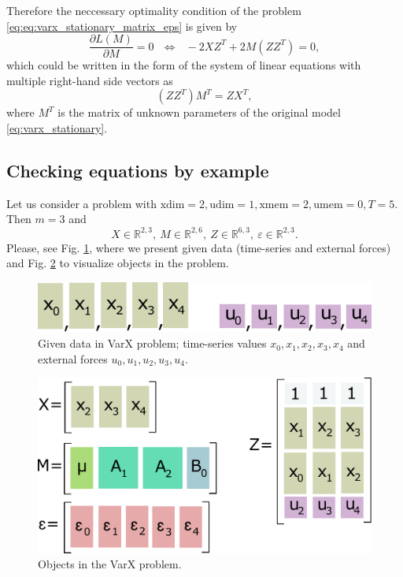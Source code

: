 \documentclass{article}
\begin{document}
 Therefore the neccessary optimality condition of the problem \eqref{eq:eq:varx_stationary_matrix_eps} is given by
 \begin{displaymath}
  \frac{\partial L(M)}{\partial M} = 0 ~~~ \Leftrightarrow ~~~ -2XZ^T + 2M(ZZ^T) = 0,
 \end{displaymath}
 which could be written in the form of the system of linear equations with multiple right-hand side vectors as
 \begin{equation}
  \label{eq:varx_stationary_system}
  (ZZ^T) M^T = ZX^T,
 \end{equation}
 where $M^T$ is the matrix of unknown parameters of the original model \eqref{eq:varx_stationary}.

 \subsection{Checking equations by example}
 
 Let us consider a problem with $\mathrm{xdim} = 2, \mathrm{udim} = 1, \mathrm{xmem} = 2, \mathrm{umem} = 0, T = 5$. Then $m = 3$ and
 \begin{displaymath}
  X \in \mathbb{R}^{2,3}, ~ M \in \mathbb{R}^{2,6}, ~ Z \in \mathbb{R}^{6,3}, ~\varepsilon \in \mathbb{R}^{2,3}.
 \end{displaymath}
 Please, see Fig. \ref{fig:varx1}, where we present given data (time-series and external forces) and Fig. \ref{fig:varx2} to visualize objects in the problem.
 
 \begin{figure}[h!]
  \centering
    \includegraphics[scale=0.2]{varx1.pdf}
  \caption{Given data in VarX problem; time-series values $x_0,x_1,x_2,x_3,x_4$ and external forces $u_0,u_1,u_2,u_3,u_4$.}
  \label{fig:varx1}
 \end{figure}

 \begin{figure}[h!]
  \centering
    \includegraphics[scale=0.2]{varx2.pdf}
  \caption{Objects in the VarX problem.}
  \label{fig:varx2}
 \end{figure}
\end{document}
